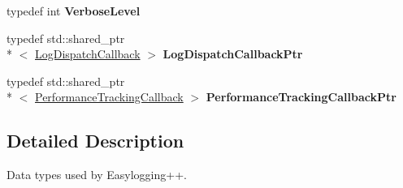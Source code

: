 \begin{DoxyCompactItemize}
\item 
\hypertarget{namespaceel_1_1base_1_1type_a3f79fa74639a13c32f794ba074fe7fb4}{typedef int {\bfseries Verbose\-Level}}\label{namespaceel_1_1base_1_1type_a3f79fa74639a13c32f794ba074fe7fb4}

\item 
\hypertarget{namespaceel_1_1base_1_1type_a887283511935c7a6d5ca99df8099f33f}{typedef std\-::shared\-\_\-ptr\\*
$<$ \hyperlink{classel_1_1LogDispatchCallback}{Log\-Dispatch\-Callback} $>$ {\bfseries Log\-Dispatch\-Callback\-Ptr}}\label{namespaceel_1_1base_1_1type_a887283511935c7a6d5ca99df8099f33f}

\item 
\hypertarget{namespaceel_1_1base_1_1type_a01a715419060d65c31b71fd8d067abdd}{typedef std\-::shared\-\_\-ptr\\*
$<$ \hyperlink{classel_1_1PerformanceTrackingCallback}{Performance\-Tracking\-Callback} $>$ {\bfseries Performance\-Tracking\-Callback\-Ptr}}\label{namespaceel_1_1base_1_1type_a01a715419060d65c31b71fd8d067abdd}

\end{DoxyCompactItemize}


\subsection{Detailed Description}
Data types used by Easylogging++. 